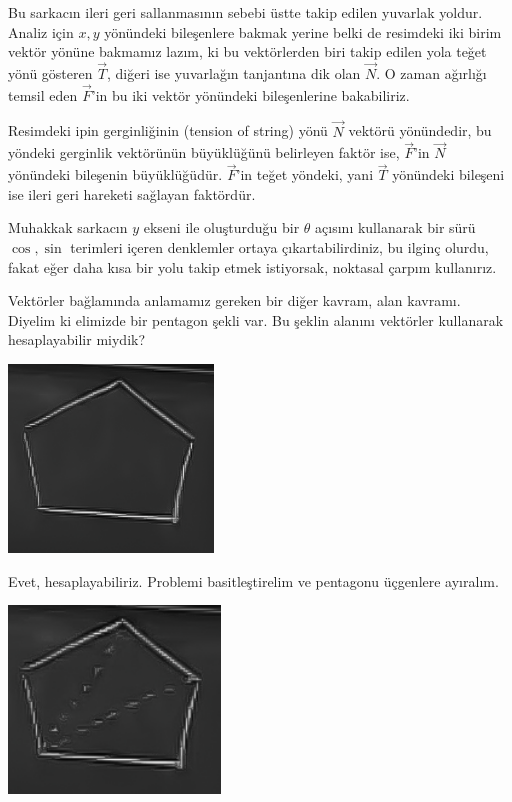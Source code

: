 \documentclass[12pt,fleqn]{article}\usepackage{../../common}
\begin{document}
Bu sarkacın ileri geri sallanmasının sebebi üstte takip edilen yuvarlak
yoldur. Analiz için $x, y$ yönündeki bileşenlere bakmak yerine belki de
resimdeki iki birim vektör yönüne bakmamız lazım, ki bu vektörlerden biri takip
edilen yola teğet yönü gösteren $\vec{T}$, diğeri ise yuvarlağın tanjantına dik
olan $\vec{N}$. O zaman ağırlığı temsil eden $\vec{F}$'in bu iki vektör
yönündeki bileşenlerine bakabiliriz.

Resimdeki ipin gerginliğinin (tension of string) yönü $\vec{N}$ vektörü
yönündedir, bu yöndeki gerginlik vektörünün büyüklüğünü belirleyen faktör ise,
$\vec{F}$'in $\vec{N}$ yönündeki bileşenin büyüklüğüdür. $\vec{F}$'in teğet
yöndeki, yani $\vec{T}$ yönündeki bileşeni ise ileri geri hareketi sağlayan
faktördür.

Muhakkak sarkacın $y$ ekseni ile oluşturduğu bir $\theta$ açısını kullanarak bir
sürü $\cos, \sin$ terimleri içeren denklemler ortaya çıkartabilirdiniz, bu
ilginç olurdu, fakat eğer daha kısa bir yolu takip etmek istiyorsak, noktasal
çarpım kullanırız.

Vektörler bağlamında anlamamız gereken bir diğer kavram, alan kavramı. Diyelim
ki elimizde bir pentagon şekli var. Bu şeklin alanını vektörler kullanarak
hesaplayabilir miydik?

\begin{center}
\includegraphics[height=5cm]{2_3.png}
\end{center}

Evet, hesaplayabiliriz. Problemi basitleştirelim ve pentagonu üçgenlere
ayıralım. 

\begin{center}
\includegraphics[height=5cm]{2_4.png}
\end{center}
\end{document}
